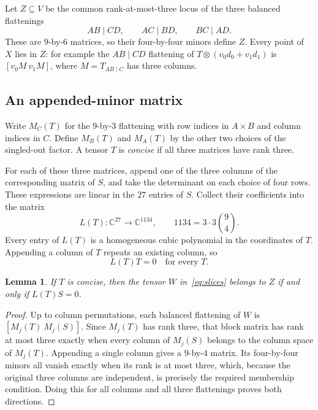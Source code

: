 \documentclass[10pt,a4paper]{article}
\newtheorem{lemma}[theorem]{Lemma}
\theoremstyle{definition}
\theoremstyle{remark}
\numberwithin{equation}{section}
\newcommand{\C}{\mathbb C}
\begin{document}
Let $Z\subseteq V$ be the common rank-at-most-three locus of the
three balanced flattenings
\begin{equation}\label{eq:Z}
 AB\mid CD,\qquad AC\mid BD,\qquad BC\mid AD.
\end{equation}
These are $9$-by-$6$ matrices, so their four-by-four minors define
$Z$. Every point of $X$ lies in $Z$: for example the $AB\mid CD$
flattening of $T\otimes(v_0d_0+v_1d_1)$ is
$[v_0M\ v_1M]$, where $M=T_{AB\mid C}$ has three columns.

\subsection{An appended-minor matrix}

Write $M_C(T)$ for the $9$-by-$3$ flattening with row indices in
$A\times B$ and column indices in $C$. Define $M_B(T)$ and
$M_A(T)$ by the other two choices of the singled-out factor.
A tensor $T$ is \emph{concise} if all three matrices have rank three.

For each of these three matrices, append one of the three columns
of the corresponding matrix of $S$, and take the determinant on
each choice of four rows. These expressions are linear in the
$27$ entries of $S$. Collect their coefficients into the matrix
\begin{equation}\label{eq:L}
 L(T):\C^{27}\longrightarrow\C^{1134},
 \qquad 1134=3\cdot3\binom94.
\end{equation}
Every entry of $L(T)$ is a homogeneous cubic polynomial in the
coordinates of $T$. Appending a column of $T$ repeats an existing
column, so
\begin{equation}\label{eq:LT}
 L(T)T=0\quad\text{for every }T.
\end{equation}

\begin{lemma}\label{lem:appended}
If $T$ is concise, then the tensor $W$ in~\eqref{eq:slices}
belongs to $Z$ if and only if $L(T)S=0$.
\end{lemma}

\begin{proof}
Up to column permutations, each balanced flattening of $W$ is
$[M_j(T)\ M_j(S)]$. Since $M_j(T)$ has rank three, that block
matrix has rank at most three exactly when every column of
$M_j(S)$ belongs to the column space of $M_j(T)$. Appending a
single column gives a $9$-by-$4$ matrix. Its four-by-four minors
all vanish exactly when its rank is at most three, which, because
the original three columns are independent, is precisely the
required membership condition. Doing this for all columns and
all three flattenings proves both directions.
\end{proof}
\end{document}
